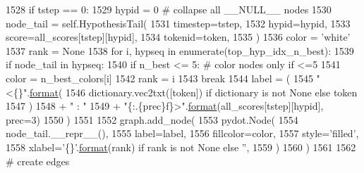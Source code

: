 \begin{DoxyCode}
1528                 \textcolor{keywordflow}{if} tstep == 0:
1529                     hypid = 0  \textcolor{comment}{# collapse all \_\_NULL\_\_ nodes}
1530                 node\_tail = self.HypothesisTail(
1531                     timestep=tstep,
1532                     hypid=hypid,
1533                     score=all\_scores[tstep][hypid],
1534                     tokenid=token,
1535                 )
1536                 color = \textcolor{stringliteral}{'white'}
1537                 rank = \textcolor{keywordtype}{None}
1538                 \textcolor{keywordflow}{for} i, hypseq \textcolor{keywordflow}{in} enumerate(top\_hyp\_idx\_n\_best):
1539                     \textcolor{keywordflow}{if} node\_tail \textcolor{keywordflow}{in} hypseq:
1540                         \textcolor{keywordflow}{if} n\_best <= 5:  \textcolor{comment}{# color nodes only if <=5}
1541                             color = n\_best\_colors[i]
1542                         rank = i
1543                         \textcolor{keywordflow}{break}
1544                 label = (
1545                     \textcolor{stringliteral}{"<\{\}"}.\hyperlink{namespaceparlai_1_1chat__service_1_1services_1_1messenger_1_1shared__utils_a32e2e2022b824fbaf80c747160b52a76}{format}(
1546                         dictionary.vec2txt([token]) \textcolor{keywordflow}{if} dictionary \textcolor{keywordflow}{is} \textcolor{keywordflow}{not} \textcolor{keywordtype}{None} \textcolor{keywordflow}{else} token
1547                     )
1548                     + \textcolor{stringliteral}{" : "}
1549                     + \textcolor{stringliteral}{"\{:.\{prec\}f\}>"}.\hyperlink{namespaceparlai_1_1chat__service_1_1services_1_1messenger_1_1shared__utils_a32e2e2022b824fbaf80c747160b52a76}{format}(all\_scores[tstep][hypid], prec=3)
1550                 )
1551 
1552                 graph.add\_node(
1553                     pydot.Node(
1554                         node\_tail.\_\_repr\_\_(),
1555                         label=label,
1556                         fillcolor=color,
1557                         style=\textcolor{stringliteral}{'filled'},
1558                         xlabel=\textcolor{stringliteral}{'\{\}'}.\hyperlink{namespaceparlai_1_1chat__service_1_1services_1_1messenger_1_1shared__utils_a32e2e2022b824fbaf80c747160b52a76}{format}(rank) \textcolor{keywordflow}{if} rank \textcolor{keywordflow}{is} \textcolor{keywordflow}{not} \textcolor{keywordtype}{None} \textcolor{keywordflow}{else} \textcolor{stringliteral}{''},
1559                     )
1560                 )
1561 
1562         \textcolor{comment}{# create edges}

\end{DoxyCode}
